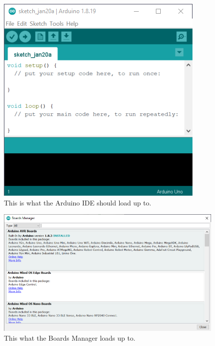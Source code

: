 \begin{figure}[!htb]
	\centering
	\includegraphics[scale=1.0]{arduinoStart/emptysketch.PNG}
	\caption{This is what the Arduino IDE should load up to.}
	\label{fig:emptysketch}
\end{figure} 

\begin{figure}[!htb]
	\centering
	\includegraphics[scale=1.0]{arduinoStart/BoardsManager.PNG}
	\caption{This what the Boards Manager loads up to.}
	\label{fig:boardsManager}
\end{figure} 
